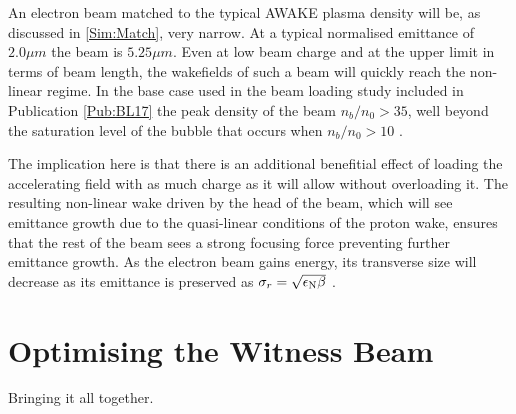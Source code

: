 An electron beam matched to the typical AWAKE plasma density will be, as discussed in \ref{Sim:Match}, very narrow. At a typical normalised emittance of $2.0\unit{\mu m}$ the beam is $5.25\unit{\mu m}$. Even at low beam charge and at the upper limit in terms of beam length, the wakefields of such a beam will quickly reach the non-linear regime. In the base case used in the beam loading study included in Publication \ref{Pub:BL17} \cite{berglyd_olsen:2017-1} the peak density of the beam $n_b/n_0 > 35$, well beyond the saturation level of the bubble that occurs when $n_b/n_0 > 10$ \cite{lu:2005}.

The implication here is that there is an additional benefitial effect of loading the accelerating field with as much charge as it will allow without overloading it. The resulting non-linear wake driven by the head of the beam, which will see emittance growth due to the quasi-linear conditions of the proton wake, ensures that the rest of the beam sees a strong focusing force preventing further emittance growth. As the electron beam gains energy, its transverse size will decrease as its emittance is preserved as $\sigma_{r} = \sqrt{\epsilon_{\mathrm{N}}\beta}$ \cite{wille:2001}.


\section{Optimising the Witness Beam}
\label{Sim:Opt}

Bringing it all together.


